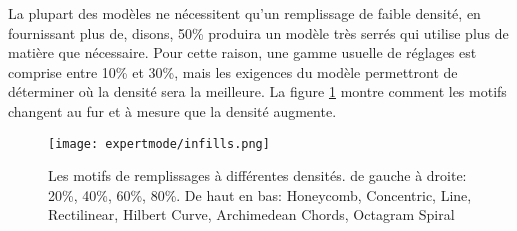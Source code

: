 La plupart des mod\`eles ne n\'ecessitent qu'un remplissage de faible densit\'e, en fournissant plus de, disons, 50\% produira un mod\`ele tr\`es serr\'es qui utilise plus de mati\`ere que n\'ecessaire. Pour cette raison, une gamme usuelle de r\'eglages est comprise entre 10\% et 30\%, mais les exigences du mod\`ele permettront de d\'eterminer o\`u la densit\'e sera la meilleure.  La figure \ref{fig:infill_pattern_densities} montre comment les motifs changent au fur et \`a mesure que la densit\'e augmente.
\begin{figure}[H]
\centering
\texttt{[image: expertmode/infills.png]}
\caption{ Les motifs de remplissages \`a diff\'erentes densit\'es. de gauche \`a droite: 20\%, 40\%, 60\%, 80\%. De haut en bas: Honeycomb, Concentric, Line, Rectilinear, Hilbert Curve, Archimedean Chords, Octagram Spiral}
\label{fig:infill_pattern_densities}
\end{figure}

